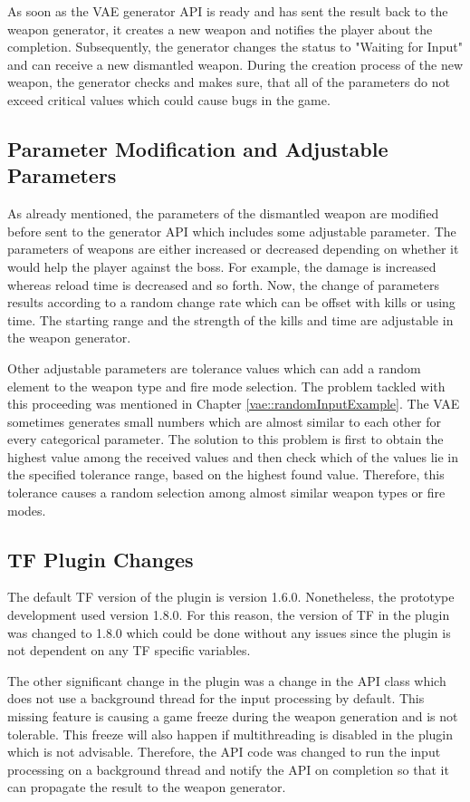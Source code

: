 \documentclass[MGS,Master,english]{twbook}%
\begin{document}
As soon as the \ac{VAE} generator \ac{API} is ready and has sent the result back to the weapon generator, it creates a new weapon and notifies the player about the completion. Subsequently, the generator changes the status to "Waiting for Input" and can receive a new dismantled weapon. During the creation process of the new weapon, the generator checks and makes sure, that all of the parameters do not exceed critical values which could cause bugs in the game. 

\subsection{Parameter Modification and Adjustable Parameters}
As already mentioned, the parameters of the dismantled weapon are modified before sent to the generator \ac{API} which includes some adjustable parameter. The parameters of weapons are either increased or decreased depending on whether it would help the player against the boss. For example, the damage is increased whereas reload time is decreased and so forth. Now, the change of parameters results according to a random change rate which can be offset with kills or using time. The starting range and the strength of the kills and time are adjustable in the weapon generator. 

Other adjustable parameters are tolerance values which can add a random element to the weapon type and fire mode selection. The problem tackled with this proceeding was mentioned in Chapter \ref{vae::randomInputExample}. The \ac{VAE} sometimes generates small numbers which are almost similar to each other for every categorical parameter. The solution to this problem is first to obtain the highest value among the received values and then check which of the values lie in the specified tolerance range, based on the highest found value. Therefore, this tolerance causes a random selection among almost similar weapon types or fire modes.

\subsection{\acl{TF} Plugin Changes}
The default \ac{TF} version of the plugin is version 1.6.0. Nonetheless, the prototype development used version 1.8.0. For this reason, the version of \ac{TF} in the plugin was changed to 1.8.0 which could be done without any issues since the plugin is not dependent on any \ac{TF} specific variables.

The other significant change in the plugin was a change in the \ac{API} class which does not use a background thread for the input processing by default. This missing feature is causing a game freeze during the weapon generation and is not tolerable. This freeze will also happen if multithreading is disabled in the plugin which is not advisable. Therefore, the \ac{API} code was changed to run the input processing on a background thread and notify the \ac{API} on completion so that it can propagate the result to the weapon generator.
\end{document}
